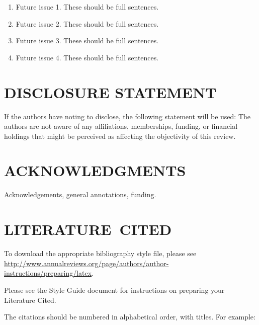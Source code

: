 \documentclass{ar-1col}
\begin{document}
\begin{issues}
\begin{enumerate}
\item Future issue 1. These should be full sentences.
\item Future issue 2. These should be full sentences.
\item Future issue 3. These should be full sentences.
\item Future issue 4. These should be full sentences.
\end{enumerate}
\end{issues}

\section*{DISCLOSURE STATEMENT}
If the authors have noting to disclose, the following statement will be used: The authors are not aware of any affiliations, memberships, funding, or financial holdings that
might be perceived as affecting the objectivity of this review. 

\section*{ACKNOWLEDGMENTS}
Acknowledgements, general annotations, funding.

%
\section*{LITERATURE\ CITED}

To download the appropriate bibliography style file, please see \url{http://www.annualreviews.org/page/authors/author-instructions/preparing/latex}. 

\noindent
Please see the Style Guide document for instructions on preparing your Literature Cited.

The citations should be numbered in alphabetical order, with titles. For example:
\end{document}
